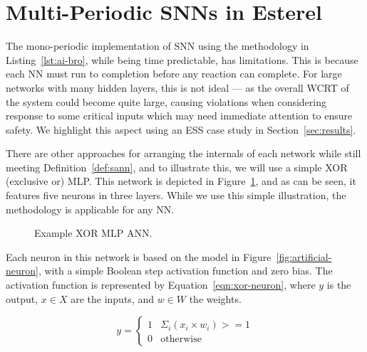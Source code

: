 \section{Multi-Periodic \acp{SNN} in Esterel}
\label{sec:esterel-mapping}

The mono-periodic implementation of \ac{SNN} using the methodology in Listing~\ref{lst:ai-bro}, while being time predictable, has limitations.
This is because each \ac{NN} must run to completion before any reaction can complete. 
For large networks with many hidden layers, this is not ideal --- as
the overall \ac{WCRT} of the system could become quite large, causing
violations when considering response to some critical inputs which may
need immediate attention to ensure safety. We highlight this aspect
using an \acf{ESS} case study in Section~\ref{sec:results}.

There are other approaches for arranging the internals of each network while still meeting Definition~\ref{def:sann}, and to illustrate this, we will use a simple XOR (exclusive or) \ac{MLP}.
This network is depicted in Figure~\ref{fig:xor-ann}, and as can be seen, it features five neurons in three layers. While we use this simple illustration, the 
methodology is applicable for any \ac{NN}.

\begin{figure}[H]
	\centering
	\scalebox{0.8}{}
	\caption{Example XOR \ac{MLP} \ac{ANN}.	\label{fig:xor-ann}}
\end{figure}

Each neuron in this network is based on the model in Figure~\ref{fig:artificial-neuron}, with a simple Boolean step activation function and zero bias. 
The activation function is represented by Equation~\ref{eqn:xor-neuron}, where $y$ is the output, $x \in X$ are the inputs, and $w \in W$ the weights.

\begin{equation}
y =
\begin{cases}
1 & \text{$\Sigma_{i} \left(x_i \times w_i\right) >= 1$} \\
0 & \text{otherwise}
\end{cases}
\label{eqn:xor-neuron}
\end{equation}


